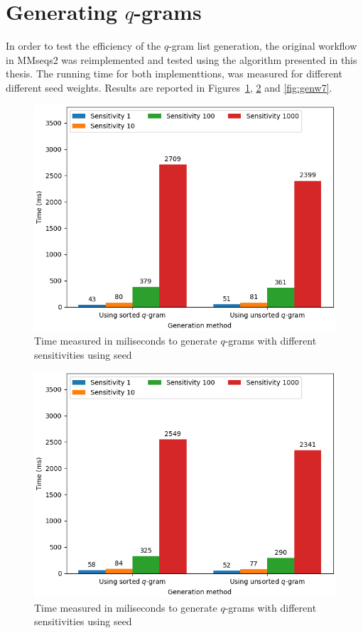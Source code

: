 \documentclass[twoside,a4paper,bsc]{master}
\newcommand{\Qgram}[1]{\(#1\)-gram}
\begin{document}
\section{Generating \Qgram{q}s}
In order to test the efficiency of the \Qgram{q} list generation, the
original workflow in MMseqs2 was reimplemented and tested using the
algorithm presented in this thesis.
The running time for both implementtions, was measured for different
different seed weights. Results are reported in
Figures~\ref{fig:genw5}, \ref{fig:genw6} and \ref{fig:genw7}.
\begin{figure}
\centering
\includegraphics[scale=0.6]{graphics/gen_w5.png}
\caption{Time measured in miliseconds to generate \Qgram{q}s with
different sensitivities using seed }
\label{fig:genw5}
\end{figure}
\begin{figure}
\centering
\includegraphics[scale=0.6]{graphics/gen_w6.png}
\caption{Time measured in miliseconds to generate \Qgram{q}s with
different sensitivities using seed }
\label{fig:genw6}
\end{figure}
\end{document}
